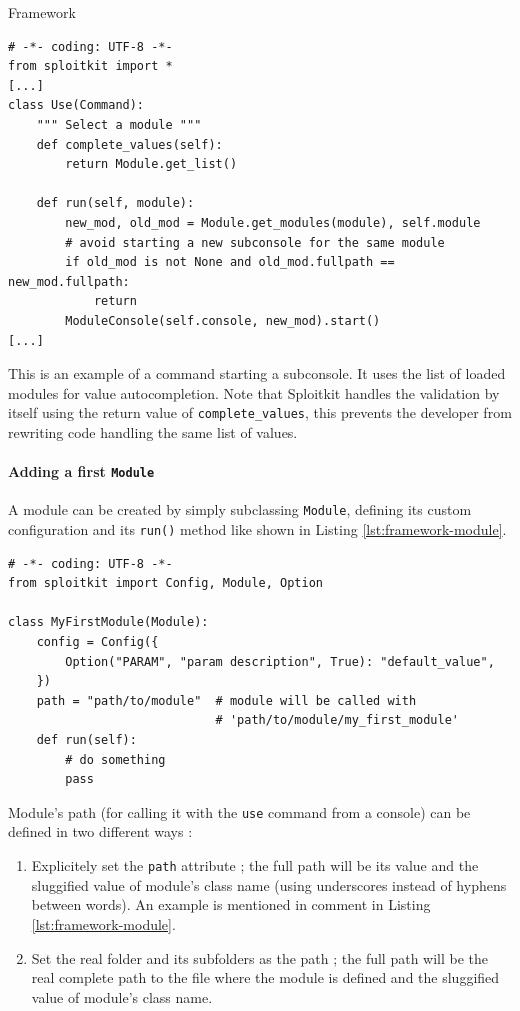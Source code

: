 \begin{chaptercover}{Framework}
\begin{center}
\begin{lstlisting}[caption={Commands file \texttt{sploitkit/base/module.py} from Sploitkit},emph={Use,Command,run}]
# -*- coding: UTF-8 -*-
from sploitkit import *
[...]
class Use(Command):
    """ Select a module """
    def complete_values(self):
        return Module.get_list()
    
    def run(self, module):
        new_mod, old_mod = Module.get_modules(module), self.module
        # avoid starting a new subconsole for the same module
        if old_mod is not None and old_mod.fullpath == new_mod.fullpath:
            return
        ModuleConsole(self.console, new_mod).start()
[...]
\end{lstlisting}\label{lst:framework-command}
\end{center}

This is an example of a command starting a subconsole. It uses the list of loaded modules for value autocompletion. Note that Sploitkit handles the validation by itself using the return value of \texttt{complete\_values}, this prevents the developer from rewriting code handling the same list of values.

\paragraph{Adding a first \texttt{Module}} A module can be created by simply subclassing \texttt{Module}, defining its custom configuration and its \texttt{run()} method like shown in Listing \ref{lst:framework-module}.

\begin{center}
\begin{lstlisting}[caption={Module file \texttt{my-first-module.py}},emph={MyFirstModule,Module,run,config,Config,Option}]
# -*- coding: UTF-8 -*-
from sploitkit import Config, Module, Option

class MyFirstModule(Module):
    config = Config({
        Option("PARAM", "param description", True): "default_value",
    })
    path = "path/to/module"  # module will be called with
                             # 'path/to/module/my_first_module'
    def run(self):
        # do something
        pass
\end{lstlisting}\label{lst:framework-module}
\end{center}

Module's path (for calling it with the \texttt{use} command from a console) can be defined in two different ways :
\begin{enumerate}
  \item Explicitely set the \texttt{path} attribute ; the full path will be its value and the sluggified value of module's class name (using underscores instead of hyphens between words). An example is mentioned in comment in Listing \ref{lst:framework-module}.
  \item Set the real folder and its subfolders as the path ; the full path will be the real complete path to the file where the module is defined and the sluggified value of module's class name.
\end{enumerate}



\end{chaptercover}
